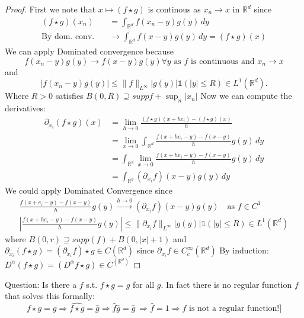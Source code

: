 \documentclass{report}
\theoremstyle{tommy}
\begin{document}
  \begin{proof}
    First we note that \(x \mapsto (f \star g)\) is continous as \(x_n \to x\) in \(\mathbb{R}^d\) since
    \begin{align*}
      (f \star g)(x_n) 
      &= \int_{\mathbb{R}^d} f(x_n - y) g(y) \, dy \\
      \text{By dom. conv.} \quad &\longrightarrow \int_{\mathbb{R}^d} f(x-y) g(y) \, dy = (f \star g)(x)
    \end{align*}
    We can apply Dominated convergence because 
      \[f(x_n - y)g(y) \to f(x-y)g(y) \forall y \text{ as \(f\) is continuous and } x_n \to x\]
      and
      \[|f(x_n -y) g(y)| \le \|f\|_{L^\infty} |g(y)| \mathbb{1}(|y| \le R) \in L^1(\mathbb{R}^d).\]
      Where \(R > 0\) satisfies \(B(0, R) \supseteq supp f + \sup_n |x_n|\)
      Now we can compute the derivatives:
      \begin{align*}
        \partial_{x_i} (f \star g)(x)
        &= \lim_{h \to 0} \frac{(f \star g)(x + he_i) - (f \star g)(x)}{h} \\
        &= \lim_{x \to 0} \int_{\mathbb{R}^d} \frac{f(x + he_i - y) - f(x-y)}{h} g(y) \, dy \\
        &= \int_{\mathbb{R}^d}\lim_{x \to 0} \frac{f(x + he_i - y) - f(x-y)}{h} g(y) \, dy \\
        &= \int_{\mathbb{R}^d} (\partial_{x_i} f)(x-y) g(y) \, dy
      \end{align*}
      We could apply Dominated Convergence since
      \begin{align*}
        \frac{f(x + e_i -y) - f(x-y)}{h} g(y) \xrightarrow{h \to 0} (\partial_{x_i} f) (x-y) g(y) \quad \text{as \(f \in C^1\)} \\
        \left| \frac{f(x + h e_i -y) - f(x-y)}{h} g(y) \right| \le \| \partial_{x_i} f \|_{L^\infty} |g(y)| \mathbb{1}(|y| \le R) \in L^1(\mathbb{R}^d)
      \end{align*}
      where \(B(0, r) \supseteq supp(f) + B(0, |x| + 1)\)
      and \(\partial_{x_i} (f \star g) = (\partial_{x_i} f) \star g \in C(\mathbb{R}^d)\) since \(\partial_{x_i} f \in C_c^\infty(\mathbb{R}^d)\)
      By induction: \(D^\alpha (f \star g) = (D^\alpha f \star g) \in C^(\mathbb{R}^d)\)
  \end{proof}

  Question: Is there a \(f\) s.t. \(f \star g = g\) for all \(g\). In fact there is no regular function \(f\) that solves this formally:
  \[f \star g = g \Rightarrow \hat{f \star g} = \hat g \Rightarrow \hat f \hat g = \hat g\ \Rightarrow \hat f = 1 \Rightarrow f \text{ is not a regular function!}]\]
\end{document}
